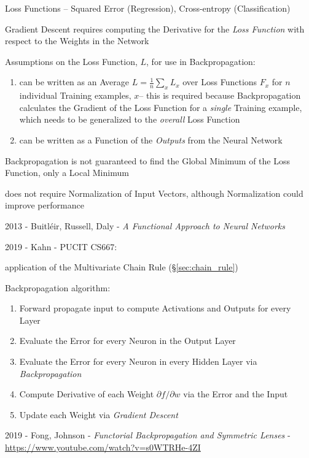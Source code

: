 Loss Functions -- Squared Error (Regression), Cross-entropy (Classification)

Gradient Descent requires computing the Derivative for the \emph{Loss Function}
with respect to the Weights in the Network

Assumptions on the Loss Function, $L$, for use in Backpropagation:
\begin{enumerate}
  \item can be written as an Average $L = \frac{1}{n} \sum_x L_x$ over Loss
    Functions $F_x$ for $n$ individual Training examples, $x$-- this is required
    because Backpropagation calculates the Gradient of the Loss Function for a
    \emph{single} Training example, which needs to be generalized to the
    \emph{overall} Loss Function
  \item can be written as a Function of the \emph{Outputs} from the Neural
    Network
\end{enumerate}

Backpropagation is not guaranteed to find the Global Minimum of the Loss
Function, only a Local Minimum

does not require Normalization of Input Vectors, although Normalization could
improve performance

2013 - Buitl\'eir, Russell, Daly -
\emph{A Functional Approach to Neural Networks}

2019 - Kahn - PUCIT CS667:

application of the Multivariate Chain Rule (\S\ref{sec:chain_rule})

Backpropagation algorithm:
\begin{enumerate}
  \item Forward propagate input to compute Activations and Outputs for every
    Layer
  \item Evaluate the Error for every Neuron in the Output Layer
  \item Evaluate the Error for every Neuron in every Hidden Layer via
    \emph{Backpropagation}
  \item Compute Derivative of each Weight $\partial f / \partial w$ via the
    Error and the Input
  \item Update each Weight via \emph{Gradient Descent}
\end{enumerate}

\asterism

2019 - Fong, Johnson - \emph{Functorial Backpropagation and Symmetric Lenses} -
\url{https://www.youtube.com/watch?v=s0WTRHe-4ZI}

